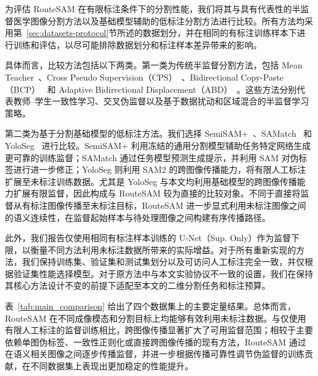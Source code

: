 \documentclass[UTF8,a4paper,10pt,twocolumn]{ctexart}
\begin{document}
为评估 RouteSAM 在有限标注条件下的分割性能，我们将其与具有代表性的半监督医学图像分割方法以及基础模型辅助的低标注分割方法进行比较。所有方法均采用第~\ref{sec:datasets-protocol}节所述的数据划分，并在相同的有标注训练样本下进行训练和评估，以尽可能排除数据划分和标注样本差异带来的影响。

具体而言，比较方法包括以下两类。第一类为传统半监督分割方法，包括 Mean Teacher~\cite{tarvainen2017meanteacher}、Cross Pseudo Supervision（CPS）~\cite{chen2021cps}、Bidirectional Copy-Paste（BCP）~\cite{bai2023bcp} 和 Adaptive Bidirectional Displacement（ABD）~\cite{chi2024abd}。这些方法分别代表教师--学生一致性学习、交叉伪监督以及基于数据扰动和区域混合的半监督学习策略。

第二类为基于分割基础模型的低标注方法。我们选择 SemiSAM+~\cite{zhang2025semisamplus}、SAMatch~\cite{xu2024samatch} 和 YoloSeg~\cite{zhang2026yoloseg} 进行比较。SemiSAM+ 利用冻结的通用分割模型辅助任务特定网络生成更可靠的训练监督；SAMatch 通过任务模型预测生成提示，并利用 SAM 对伪标签进行进一步修正；YoloSeg 则利用 SAM2 的跨图像传播能力，将有限人工标注扩展至未标注训练数据。尤其是 YoloSeg 与本文均利用基础模型的跨图像传播能力扩展有限监督，因此构成与 RouteSAM 较为直接的比较对象。不同于直接将监督从有标注图像传播至未标注目标，RouteSAM 进一步显式利用未标注图像之间的语义连续性，在监督起始样本与待处理图像之间构建有序传播路径。

此外，我们报告仅使用相同有标注样本训练的 U-Net（Sup. Only）作为监督下限，以衡量不同方法利用未标注数据所带来的实际增益。对于所有重新实现的方法，我们保持训练集、验证集和测试集划分以及可访问人工标注完全一致，并仅根据验证集性能选择模型。对于原方法中与本文实验协议不一致的设置，我们在保持其核心方法设计不变的前提下适配至本文的二维分割任务和标注预算。

表~\ref{tab:main_comparison} 给出了四个数据集上的主要定量结果。总体而言，RouteSAM 在不同成像模态和分割目标上均能够有效利用未标注数据。与仅使用有限人工标注的监督训练相比，跨图像传播显著扩大了可用监督范围；相较于主要依赖单图伪标签、一致性正则化或直接跨图像传播的现有方法，RouteSAM 通过在语义相关图像之间逐步传播监督，并进一步根据传播可靠性调节伪监督的训练贡献，在不同数据集上表现出更加稳定的性能提升。
\end{document}
